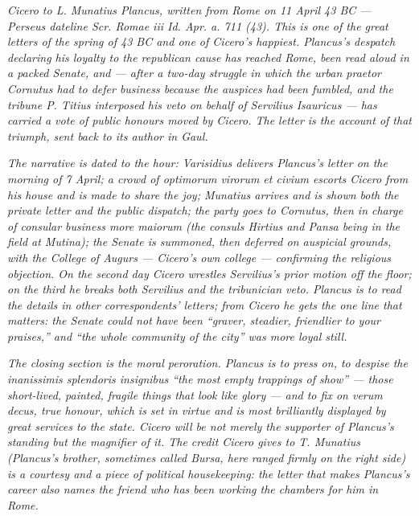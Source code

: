 
\textit{Cicero to L. Munatius Plancus, written from Rome on 11
April 43 BC --- Perseus dateline \textit{Scr. Romae iii Id. Apr.
a. 711 (43)}. This is one of the great letters of the spring of
43 BC and one of Cicero's happiest. Plancus's despatch
declaring his loyalty to the republican cause has reached Rome,
been read aloud in a packed Senate, and --- after a two-day
struggle in which the urban praetor Cornutus had to defer
business because the auspices had been fumbled, and the
tribune P. Titius interposed his veto on behalf of Servilius
Isauricus --- has carried a vote of public honours moved by
Cicero. The letter is the account of that triumph, sent back
to its author in Gaul.}

\textit{The narrative is dated to the hour: Varisidius delivers
Plancus's letter on the morning of 7 April; a crowd of
\textit{optimorum virorum et civium} escorts Cicero from his
house and is made to share the joy; Munatius arrives and is
shown both the private letter and the public dispatch; the
party goes to Cornutus, then in charge of consular business
\textit{more maiorum} (the consuls Hirtius and Pansa being in
the field at Mutina); the Senate is summoned, then deferred on
auspicial grounds, with the College of Augurs --- Cicero's own
college --- confirming the religious objection. On the second
day Cicero wrestles Servilius's prior motion off the floor;
on the third he breaks both Servilius and the tribunician
veto. Plancus is to read the details in other correspondents'
letters; from Cicero he gets the one line that matters: the
Senate could not have been ``graver, steadier, friendlier to
your praises,'' and ``the whole community of the city'' was
more loyal still.}

\textit{The closing section is the moral peroration. Plancus is
to press on, to despise the \textit{inanissimis splendoris
insignibus} ``the most empty trappings of show'' --- those
short-lived, painted, fragile things that look like glory ---
and to fix on \textit{verum decus}, true honour, which is set in
virtue and is most brilliantly displayed by great services to
the state. Cicero will be not merely the supporter of Plancus's
standing but the magnifier of it. The credit Cicero gives to T.
Munatius (Plancus's brother, sometimes called Bursa, here ranged
firmly on the right side) is a courtesy and a piece of
political housekeeping: the letter that makes Plancus's career
also names the friend who has been working the chambers for him
in Rome.}
